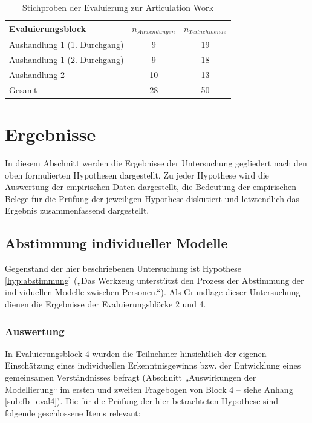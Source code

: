 \begin{table}[htbp]
	\centering
	\caption{Stichproben der Evaluierung zur Articulation Work}

		\begin{tabular}{| l || c | c |}
		\hline
			Evaluierungsblock & $n_{Anwendungen}$ & $n_{Teilnehmende}$ \\ \hline
			Aushandlung 1 (1. Durchgang)  &  9 & 19 \\
			Aushandlung 1 (2. Durchgang)  &  9 & 18 \\
			Aushandlung 2				  & 10 & 13 \\ \hline
			Gesamt						  & 28 & 50 \\ \hline
	\end{tabular}
	\label{tab:stichprobe_aw}
\end{table}


\section{Ergebnisse} %
\label{sec:a_ergebnisse}

In diesem Abschnitt werden die Ergebnisse der Untersuchung gegliedert nach den oben formulierten Hypothesen dargestellt. Zu jeder Hypothese wird die Auswertung der empirischen Daten dargestellt, die Bedeutung der empirischen Belege für die Prüfung der jeweiligen Hypothese diskutiert und letztendlich das Ergebnis zusammenfassend dargestellt.  

\subsection{Abstimmung individueller Modelle} %
\label{sub:abstimmung_individueller_modelle}

Gegenstand der hier beschriebenen Untersuchung ist Hypothese \ref{hyp:abstimmung} („Das Werkzeug unterstützt den Prozess der Abstimmung der individuellen Modelle zwischen Personen.“). Als Grundlage dieser Untersuchung dienen die Ergebnisse der Evaluierungsblöcke 2 und 4.

\subsubsection{Auswertung} 

In Evaluierungsblock 4 wurden die Teilnehmer hinsichtlich der eigenen Einschätzung eines individuellen Erkenntnisgewinns bzw. der Entwicklung eines gemeinsamen Verständnisses befragt (Abschnitt „Auswirkungen der Modellierung“ im ersten und zweiten Fragebogen von Block 4  -- siehe Anhang \ref{sub:fb_eval4}). Die für die Prüfung der hier betrachteten Hypothese sind folgende geschlossene Items relevant:

